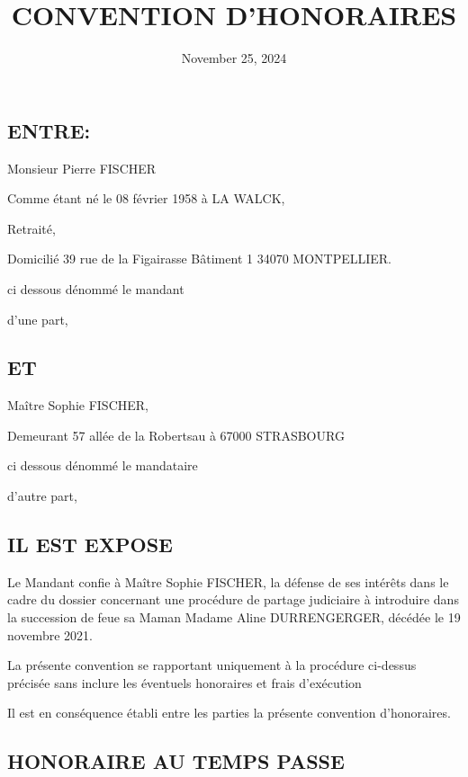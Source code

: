 \documentclass[
  11pt,
]{letter}
\title{CONVENTION D'HONORAIRES}
\author{}
\date{November 25, 2024}
\begin{document}
\begin{letter}{}
\ifdefined\Shaded\renewenvironment{Shaded}{\begin{tcolorbox}[boxrule=0pt, enhanced, borderline west={3pt}{0pt}{shadecolor}, interior hidden, breakable, frame hidden, sharp corners]}{\end{tcolorbox}}\fi

\hypertarget{entre}{%
\subsection{ENTRE:}\label{entre}}

Monsieur Pierre FISCHER

Comme étant né le 08 février 1958 à LA WALCK,

Retraité,

Domicilié 39 rue de la Figairasse Bâtiment 1 34070 MONTPELLIER.

ci dessous dénommé le mandant

d'une part,

\hypertarget{et}{%
\subsection{ET}\label{et}}

Maître Sophie FISCHER,

Demeurant 57 allée de la Robertsau à 67000 STRASBOURG

ci dessous dénommé le mandataire

d'autre part,

\hypertarget{il-est-expose}{%
\subsection{IL EST EXPOSE}\label{il-est-expose}}

Le Mandant confie à Maître Sophie FISCHER, la défense de ses intérêts
dans le cadre du dossier concernant une procédure de partage judiciaire
à introduire dans la succession de feue sa Maman Madame Aline
DURRENGERGER, décédée le 19 novembre 2021.

La présente convention se rapportant uniquement à la procédure ci-dessus
précisée sans inclure les éventuels honoraires et frais d'exécution

Il est en conséquence établi entre les parties la présente convention
d'honoraires.

\hypertarget{honoraire-au-temps-passe}{%
\subsection{HONORAIRE AU TEMPS PASSE}\label{honoraire-au-temps-passe}}


\end{letter}
\end{document}
